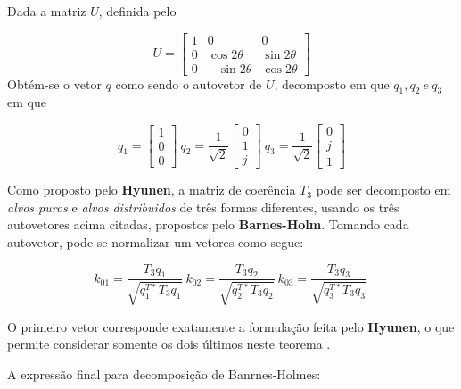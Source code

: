 \documentclass{article}
\begin{document}
Dada a matriz $U$, definida pelo

    \begin{equation}
        U = \begin{bmatrix}
            1 & 0 & 0 \\
            0 & \cos{2\theta} & \sin{2\theta} \\
            0 & -\sin{2\theta} & \cos{2\theta}
        \end{bmatrix}
    \end{equation} 
Obtém-se o vetor $q$ como sendo o autovetor de $U$, decomposto em que $q_{1}, q_{2} \ e \ q_{3}$ em que

    \begin{equation}
        q_{1} =\begin{bmatrix}
            1 \\
            0 \\
            0
        \end{bmatrix} \ 
        q_{2} = \frac{1}{\sqrt{2}}\begin{bmatrix}
            0 \\
            1 \\
            j
        \end{bmatrix} \ 
        q_{3} = \frac{1}{\sqrt{2}}\begin{bmatrix}
            0 \\
            j \\
            1
        \end{bmatrix}
    \end{equation}
    
Como proposto pelo \textbf{Hyunen}, a matriz de coerência $T_{3}$ pode ser decomposto em \textit{alvos puros} e \textit{alvos distribuidos} de três formas diferentes, usando os três autovetores acima citadas, propostos pelo \textbf{Barnes-Holm}. 
Tomando cada autovetor, pode-se normalizar um vetores como segue:

\begin{equation}
    k_{01} = \frac{T_{3}q_{1}}{\sqrt{q_{1}^{T*}T_{3}q_{1}}} \    
    k_{02} = \frac{T_{3}q_{2}}{\sqrt{q_{2}^{T*}T_{3}q_{2}}} \    
    k_{03} = \frac{T_{3}q_{3}}{\sqrt{q_{3}^{T*}T_{3}q_{3}}} \ 
\end{equation}

O primeiro vetor corresponde exatamente a formulação feita pelo \textbf{Hyunen}, o que permite considerar somente os dois últimos neste teorema \cite{jong:2009}.

A expressão final para decomposição de Banrnes-Holmes:
\end{document}
